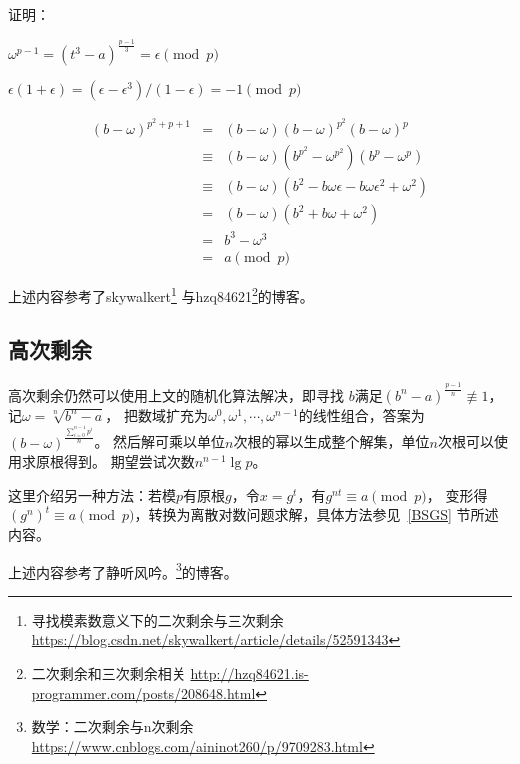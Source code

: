 证明：

\begin{lemma}
    $\omega^{p-1}=(t^3-a)^\frac{p-1}{3}=\epsilon \pmod{p}$
\end{lemma}

\begin{lemma}
    $\epsilon(1+\epsilon)=(\epsilon-\epsilon^3)/(1-\epsilon)= -1 \pmod{p}$
\end{lemma}

\begin{eqnarray*}
    (b-\omega)^{p^2+p+1}&=&(b-\omega)(b-\omega)^{p^2}(b-\omega)^p\\
    &\equiv&(b-\omega)(b^{p^2}-\omega^{p^2})(b^p-\omega^p)\\
    &\equiv&(b-\omega)(b^2-b\omega\epsilon-b\omega\epsilon^2+\omega^2)\\
    &=&(b-\omega)(b^2+b\omega+\omega^2)\\
    &=&b^3-\omega^3\\
    &=&a \pmod{p}
\end{eqnarray*}

上述内容参考了skywalkert\footnote{
  寻找模素数意义下的二次剩余与三次剩余
  \url{https://blog.csdn.net/skywalkert/article/details/52591343}
}
与hzq84621\footnote{
    二次剩余和三次剩余相关
    \url{http://hzq84621.is-programmer.com/posts/208648.html}
}的博客。
\subsection{高次剩余}
高次剩余仍然可以使用上文的随机化算法解决，即寻找
$b$满足$(b^n-a)^\frac{p-1}{n}\not \equiv 1$，记$\omega=\sqrt[n]{b^n-a}$，
把数域扩充为$\omega^0,\omega^1,\cdots,\omega^{n-1}$的线性组合，答案为
$(b-\omega)^\frac{\displaystyle \sum_{i=0}^{n-1}{p^i}}{n}$。
然后解可乘以单位$n$次根的幂以生成整个解集，单位$n$次根可以使用求原根得到。
期望尝试次数$n^{n-1}\lg p$。

这里介绍另一种方法：若模$p$有原根$g$，令$x=g^t$，有$g^{nt}\equiv a\pmod{p}$，
变形得$(g^n)^t\equiv a \pmod{p}$，转换为离散对数问题求解，具体方法参见~\ref{BSGS}
节所述内容。

上述内容参考了静听风吟。\footnote{
    数学：二次剩余与n次剩余
    \url{https://www.cnblogs.com/aininot260/p/9709283.html}
}的博客。
